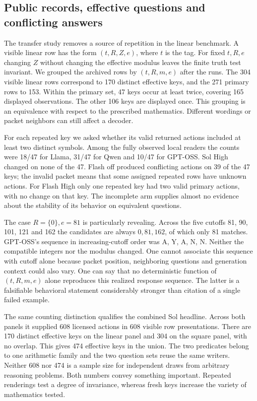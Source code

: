 \documentclass[12pt,letterpaper]{article}
\begin{document}
\subsection{Public records, effective questions and conflicting answers}
The transfer study removes a source of repetition in the linear benchmark. A visible linear row has the form $(t,R,Z,e)$, where $t$ is the tag. For fixed $t,R,e$ changing $Z$ without changing the effective modulus leaves the finite truth test invariant. We grouped the archived rows by $(t,R,m,e)$ after the runs. The 304 visible linear rows correspond to 170 distinct effective keys, and the 271 primary rows to 153. Within the primary set, 47 keys occur at least twice, covering 165 displayed observations. The other 106 keys are displayed once. This grouping is an equivalence with respect to the prescribed mathematics. Different wordings or packet neighbors can still affect a decoder.

For each repeated key we asked whether its valid returned actions included at least two distinct symbols. Among the fully observed local readers the counts were 18/47 for Llama, 31/47 for Qwen and 10/47 for GPT-OSS. Sol High changed on none of the 47. Flash off produced conflicting actions on 39 of the 47 keys; the invalid packet means that some assigned repeated rows have unknown actions. For Flash High only one repeated key had two valid primary actions, with no change on that key. The incomplete arm supplies almost no evidence about the stability of its behavior on equivalent questions.

The case $R=\{0\}, e=81$ is particularly revealing. Across the five cutoffs 81, 90, 101, 121 and 162 the candidates are always $0,81,162$, of which only 81 matches. GPT-OSS's sequence in increasing-cutoff order was A, Y, A, N, N. Neither the compatible integers nor the modulus changed. One cannot associate this sequence with cutoff alone because packet position, neighboring questions and generation context could also vary. One can say that no deterministic function of $(t,R,m,e)$ alone reproduces this realized response sequence. The latter is a falsifiable behavioral statement considerably stronger than citation of a single failed example.

The same counting distinction qualifies the combined Sol headline. Across both panels it supplied 608 licensed actions in 608 visible row presentations. There are 170 distinct effective keys on the linear panel and 304 on the square panel, with no overlap. This gives 474 effective keys in the union. The two predicates belong to one arithmetic family and the two question sets reuse the same writers. Neither 608 nor 474 is a sample size for independent draws from arbitrary reasoning problems. Both numbers convey something important. Repeated renderings test a degree of invariance, whereas fresh keys increase the variety of mathematics tested.
\end{document}
